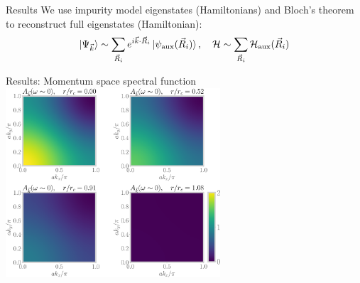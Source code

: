 \documentclass[aspectratio=169,t]{beamer}
\begin{document}
\begin{frame}{Results}
\flushleft
We use impurity model eigenstates (Hamiltonians) and \alert{Bloch's theorem} to reconstruct full eigenstates (Hamiltonian):
\[\ket{\Psi_{\vec k}} \sim \sum_{\vec R_i} e^{i \vec{k}\cdot\vec{R}_i} \ket{\psi_\text{aux}(\vec R_i)},\quad\mathcal{H} \sim \sum_{\vec R_i} \mathcal{H}_\text{aux}(\vec R_i)\]
\vspace*{\fill}
\end{frame}

\begin{frame}{Results: Momentum space spectral function}
\includegraphics[width=0.6\textwidth]{kspace-spectralfunction-all.pdf}
\end{frame}
\end{document}
